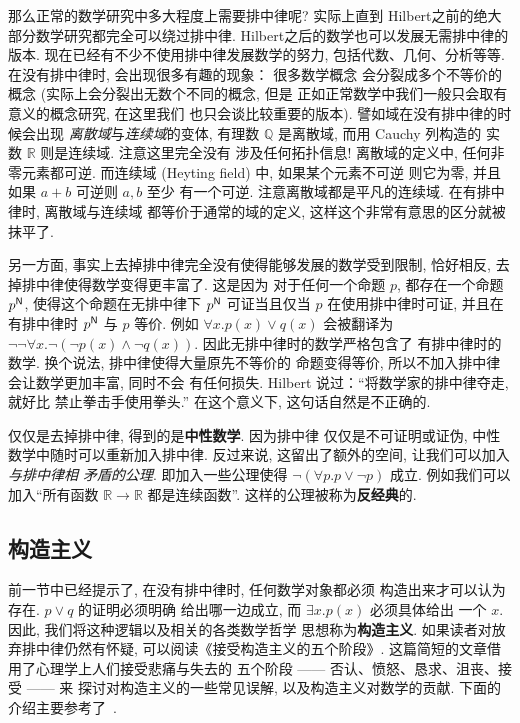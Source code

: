 那么正常的数学研究中多大程度上需要排中律呢? 实际上直到
Hilbert之前的绝大部分数学研究都完全可以绕过排中律.
Hilbert之后的数学也可以发展无需排中律的版本.
现在已经有不少不使用排中律发展数学的努力,
包括代数、几何、分析等等. 在没有排中律时,
会出现很多有趣的现象： 很多数学概念
会分裂成多个不等价的概念 (实际上会分裂出无数个不同的概念, 但是
正如正常数学中我们一般只会取有意义的概念研究, 在这里我们
也只会谈比较重要的版本). 譬如域在没有排中律的时候会出现%
\emph{离散域}与\emph{连续域}的变体, 有理数
\(\mathbb Q\) 是离散域, 而用 Cauchy 列构造的
实数 \(\mathbb R\) 则是连续域. 注意这里完全没有
涉及任何拓扑信息! 离散域的定义中, 任何非零元素都可逆.
而连续域 (Heyting field) 中, 如果某个元素不可逆
则它为零, 并且如果 \(a + b\) 可逆则 \(a, b\) 至少
有一个可逆. 注意离散域都是平凡的连续域.
在有排中律时, 离散域与连续域
都等价于通常的域的定义, 这样这个非常有意思的区分就被抹平了.

另一方面, 事实上去掉排中律完全没有使得能够发展的数学受到限制,
恰好相反, 去掉排中律使得数学变得更丰富了. 这是因为
对于任何一个命题 \(p\), 都存在一个命题 \(p^{\textsf{N}}\),
使得这个命题在无排中律下 \(p^{\textsf{N}}\) 可证当且仅当
\(p\) 在使用排中律时可证, 并且在有排中律时 \(p^{\textsf{N}}\)
与 \(p\) 等价. 例如 \(\forall x. p(x) \vee q(x)\)
会被翻译为 \(\neg \neg \forall x. \neg (\neg p(x) \wedge \neg q(x))\).
因此无排中律时的数学严格包含了
有排中律时的数学. 换个说法, 排中律使得大量原先不等价的
命题变得等价, 所以不加入排中律会让数学更加丰富, 同时不会
有任何损失. Hilbert 说过：“将数学家的排中律夺走, 就好比
禁止拳击手使用拳头.” 在这个意义下, 这句话自然是不正确的.

仅仅是去掉排中律, 得到的是\textbf{中性数学}. 因为排中律
仅仅是不可证明或证伪, 中性数学中随时可以重新加入排中律.
反过来说, 这留出了额外的空间, 让我们可以加入\emph{与排中律相
矛盾的公理}. 即加入一些公理使得 \(\neg (\forall p. p \vee \neg p)\)
成立. 例如我们可以加入“所有函数 \(\mathbb R \to \mathbb R\)
都是连续函数”. 这样的公理被称为\textbf{反经典}的.

\subsection{构造主义}

前一节中已经提示了, 在没有排中律时, 任何数学对象都必须
构造出来才可以认为存在. \(p \vee q\) 的证明必须明确
给出哪一边成立, 而 \(\exists x. p(x)\) 必须具体给出
一个 \(x\). 因此, 我们将这种逻辑以及相关的各类数学哲学
思想称为\textbf{构造主义}. 如果读者对放弃排中律仍然有怀疑,
可以阅读《接受构造主义的五个阶段》\cite{bauer:2016:fivestage}.
这篇简短的文章借用了心理学上人们接受悲痛与失去的
五个阶段 ------ 否认、愤怒、恳求、沮丧、接受 ------ 来
探讨对构造主义的一些常见误解, 以及构造主义对数学的贡献.
下面的介绍主要参考了~\cites{carl:1998:brouwer}{sep:2022:constructive}.

